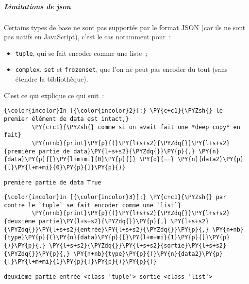     \hypertarget{limitations-de-json}{%
\subparagraph{Limitations de json}\label{limitations-de-json}}

    Certains types de base ne sont pas supportés par le format JSON (car ils
ne sont pas natifs en JavaScript), c'est le cas notamment pour~:

\begin{itemize}
\tightlist
\item
  \texttt{tuple}, qui se fait encoder comme une liste~;
\item
  \texttt{complex}, \texttt{set} et \texttt{frozenset}, que l'on ne peut
  pas encoder du tout (sans étendre la bibliothèque).
\end{itemize}

    C'est ce qui explique ce qui suit~:

    \begin{Verbatim}[commandchars=\\\{\}]
{\color{incolor}In [{\color{incolor}2}]:} \PY{c+c1}{\PYZsh{} le premier élément de data est intact,}
        \PY{c+c1}{\PYZsh{} comme si on avait fait une *deep copy* en fait}
        \PY{n+nb}{print}\PY{p}{(}\PY{l+s+s2}{\PYZdq{}}\PY{l+s+s2}{première partie de data}\PY{l+s+s2}{\PYZdq{}}\PY{p}{,} \PY{n}{data}\PY{p}{[}\PY{l+m+mi}{0}\PY{p}{]} \PY{o}{==} \PY{n}{data2}\PY{p}{[}\PY{l+m+mi}{0}\PY{p}{]}\PY{p}{)}
\end{Verbatim}


    \begin{Verbatim}[commandchars=\\\{\}]
première partie de data True

    \end{Verbatim}

    \begin{Verbatim}[commandchars=\\\{\}]
{\color{incolor}In [{\color{incolor}3}]:} \PY{c+c1}{\PYZsh{} par contre le `tuple` se fait encoder comme une `list`}
        \PY{n+nb}{print}\PY{p}{(}\PY{l+s+s2}{\PYZdq{}}\PY{l+s+s2}{deuxième partie}\PY{l+s+s2}{\PYZdq{}}\PY{p}{,} \PY{l+s+s2}{\PYZdq{}}\PY{l+s+s2}{entrée}\PY{l+s+s2}{\PYZdq{}}\PY{p}{,} \PY{n+nb}{type}\PY{p}{(}\PY{n}{data}\PY{p}{[}\PY{l+m+mi}{1}\PY{p}{]}\PY{p}{)}\PY{p}{,} \PY{l+s+s2}{\PYZdq{}}\PY{l+s+s2}{sortie}\PY{l+s+s2}{\PYZdq{}}\PY{p}{,} \PY{n+nb}{type}\PY{p}{(}\PY{n}{data2}\PY{p}{[}\PY{l+m+mi}{1}\PY{p}{]}\PY{p}{)}\PY{p}{)}
\end{Verbatim}


    \begin{Verbatim}[commandchars=\\\{\}]
deuxième partie entrée <class 'tuple'> sortie <class 'list'>

    \end{Verbatim}

